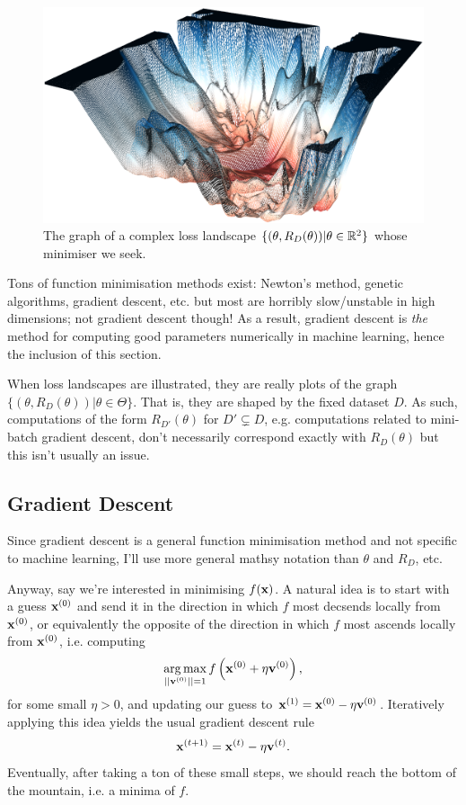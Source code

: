 \documentclass[11pt]{article}
\begin{document}
\begin{figure}[t]
    \centering
    \includegraphics[width=0.75\columnwidth]{./figures/gradient_descent/loss_landscape.png}
    \caption{The graph of a complex loss landscape $\{(\theta,R_D(\theta))|\theta\in\mathbb{R}^2\}$ whose minimiser we seek. }
    \label{fig:loss_landscape_complex}
\end{figure}

Tons of function minimisation methods exist: Newton's method, genetic algorithms, gradient descent, etc. but most are horribly slow/unstable in high dimensions; not gradient descent though! As a result, gradient descent is \textit{the} method for computing good parameters numerically in machine learning, hence the inclusion of this section.

\begin{tcolorbox}[title={\centering\textbf{Loss landscapes are dataset-dependent!}}, colback=myLightBlue, colbacktitle=myDarkBlue, colframe=myDarkBlue, coltitle=white]
    When loss landscapes are illustrated, they are really plots of the graph $\{(\theta, R_D(\theta))|\theta\in\Theta\}$. That is, they are shaped by the fixed dataset $D$. As such, computations of the form $R_{D'}(\theta)$ for $D'\subsetneq D$, e.g. computations related to mini-batch gradient descent, don't necessarily correspond exactly with $R_D(\theta)$ but this isn't usually an issue.
\end{tcolorbox}

\subsection{Gradient Descent}
Since gradient descent is a general function minimisation method and not specific to machine learning, I'll use more general mathsy notation than $\theta$ and $R_D$, etc.

Anyway, say we're interested in minimising $f(\mathbf{x})$. A natural idea is to start with a guess $\mathbf{x}^{(0)}$ and send it in the direction in which $f$ most decsends locally from $\mathbf{x}^{(0)}$, or equivalently the opposite of the direction in which $f$ most ascends locally from $\mathbf{x}^{(0)}$, i.e. computing
$$
\operatorname*{arg\,max}_{||\mathbf{v}^{(0)}||=1}f\left(\mathbf{x}^{(0)}+\eta\mathbf{v}^{(0)}\right),
$$
for some small $\eta>0$, and updating our guess to $\mathbf{x}^{(1)}=\mathbf{x}^{(0)}-\eta\mathbf{v}^{(0)}$. Iteratively applying this idea yields the usual gradient descent rule
$$
\mathbf{x}^{(t+1)}
=
\mathbf{x}^{(t)}-\eta\mathbf{v}^{(t)}.
$$
Eventually, after taking a ton of these small steps, we should reach the bottom of the mountain, i.e. a minima of $f$.
\end{document}
